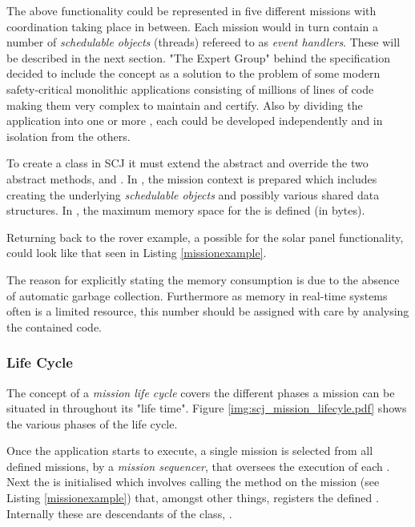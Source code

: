 The above functionality could be represented in five different missions with coordination taking place in between. Each mission would in turn contain a number of \textit{schedulable objects} (threads) refereed to as \textit{event handlers}. These will be described in the next section. "The Expert Group" behind the specification decided to include the  concept as a solution to the problem of some modern safety-critical monolithic applications consisting of millions of lines of code making them very complex to maintain and certify. Also by dividing the application into one or more , each  could be developed independently and in isolation from the others.  

To create a  class in SCJ it must extend the abstract  and override the two abstract methods,  and . In , the mission context is prepared which includes creating the underlying \textit{schedulable objects} and possibly various shared data structures. In , the maximum memory space for the  is defined (in bytes).

Returning back to the rover example, a possible  for the solar panel functionality, could look like that seen in Listing \ref{missionexample}.



The reason for explicitly stating the memory consumption is due to the absence of automatic garbage collection. Furthermore as memory in real-time systems often is a limited resource, this number should be assigned with care by analysing the contained code.

\subsubsection{Life Cycle}
\label{subsec:lifecycle}
The concept of a \textit{mission life cycle} covers the different phases a mission can be situated in throughout its "life time". Figure \ref{img:scj_mission_lifecyle.pdf} shows the various phases of the life cycle.


Once the application starts to execute, a single mission is selected from all defined missions, by a \textit{mission sequencer}, that oversees the execution of each . Next the  is initialised which involves calling the  method on the mission (see Listing \ref{missionexample}) that, amongst other things, registers the defined . Internally these are descendants of the class, . 

